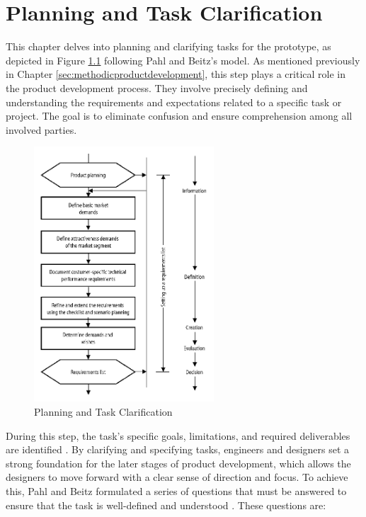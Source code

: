 \chapter{Planning and Task Clarification}
\label{ch:planning}

This chapter delves into planning and clarifying tasks for the prototype, as depicted in Figure \ref{fig:planning} following Pahl and Beitz's model. As mentioned previously in Chapter \ref{sec:methodicproductdevelopment}, this step plays a critical role in the product development process. They involve precisely defining and understanding the requirements and expectations related to a specific task or project. The goal is to eliminate confusion and ensure comprehension among all involved parties.

\begin{figure}[ht!]
    \centering
    \includegraphics[width=0.6\textwidth]{texs/Part1/chapter2/image/planning.png}
    \caption{Planning and Task Clarification \cite{Pahl07m}}
    \label{fig:planning}
\end{figure}

During this step, the task's specific goals, limitations, and required deliverables are identified \cite{Pahl07a}. By clarifying and specifying tasks, engineers and designers set a strong foundation for the later stages of product development, which allows the designers to move forward with a clear sense of direction and focus. To achieve this, Pahl and Beitz formulated a series of questions that must be answered to ensure that the task is well-defined and understood \cite{Pahl07a}. These questions are:

